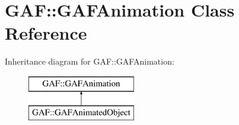 \hypertarget{class_g_a_f_1_1_g_a_f_animation}{\section{G\-A\-F\-:\-:G\-A\-F\-Animation Class Reference}
\label{class_g_a_f_1_1_g_a_f_animation}
}
Inheritance diagram for G\-A\-F\-:\-:G\-A\-F\-Animation\-:\begin{figure}[H]
\begin{center}
\leavevmode
\includegraphics[height=2.000000cm]{class_g_a_f_1_1_g_a_f_animation}
\end{center}
\end{figure}
